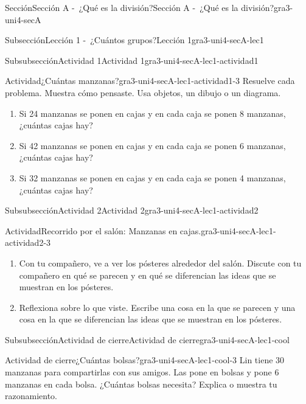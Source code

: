 \documentclass[twoside,14pt,]{extarticle}
\begin{document}
\begin{sectionptx}{Sección}{Sección A -~¿Qué es la división?}{}{Sección A -~¿Qué es la división?}{}{}{gra3-uni4-secA}
\begin{subsectionptx}{Subsección}{Lección 1 -~¿Cuántos grupos?}{}{Lección 1}{}{}{gra3-uni4-secA-lec1}
\begin{subsubsectionptx}{Subsubsección}{Actividad 1}{}{Actividad 1}{}{}{gra3-uni4-secA-lec1-actividad1}
\begin{activity}{Actividad}{¿Cuántas manzanas?}{gra3-uni4-secA-lec1-actividad1-3}%
Resuelve cada problema. Muestra cómo pensaste. Usa objetos, un dibujo o un diagrama.%
\par
%
\begin{enumerate}
\item{}Si 24 manzanas se ponen en cajas y en cada caja se ponen 8 manzanas, ¿cuántas cajas hay?%
\item{}Si 42 manzanas se ponen en cajas y en cada caja se ponen 6 manzanas, ¿cuántas cajas hay?%
\item{}Si 32 manzanas se ponen en cajas y en cada caja se ponen 4 manzanas, ¿cuántas cajas hay?%
\end{enumerate}
%
\end{activity}%
\end{subsubsectionptx}
%
%
\typeout{************************************************}
\typeout{************************************************}
%
\begin{subsubsectionptx}{Subsubsección}{Actividad 2}{}{Actividad 2}{}{}{gra3-uni4-secA-lec1-actividad2}
\begin{activity}{Actividad}{Recorrido por el salón: Manzanas en cajas.}{gra3-uni4-secA-lec1-actividad2-3}%
%
\begin{enumerate}
\item{}Con tu compañero, ve a ver los pósteres alrededor del salón. Discute con tu compañero en qué se parecen y en qué se diferencian las ideas que se muestran en los pósteres.%
\item{}Reflexiona sobre lo que viste. Escribe una cosa en la que se parecen y una cosa en la que se diferencian las ideas que se muestran en los pósteres.%
\end{enumerate}
%
\end{activity}%
\end{subsubsectionptx}
%
%
\typeout{************************************************}
\typeout{************************************************}
%
\begin{subsubsectionptx}{Subsubsección}{Actividad de cierre}{}{Actividad de cierre}{}{}{gra3-uni4-secA-lec1-cool}
\begin{project}{Actividad de cierre}{¿Cuántas bolsas?}{gra3-uni4-secA-lec1-cool-3}%
Lin tiene 30 manzanas para compartirlas con sus amigos. Las pone en bolsas y pone 6 manzanas en cada bolsa. ¿Cuántas bolsas necesita? Explica o muestra tu razonamiento.%

\end{project}
\end{subsubsectionptx}
\end{subsectionptx}
\end{sectionptx}
\end{document}
